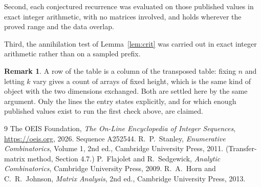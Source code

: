\documentclass[11pt,a4paper]{article}
\theoremstyle{plain}
\theoremstyle{definition}
\newtheorem{remark}[theorem]{Remark}
\begin{document}
Second, each conjectured recurrence was evaluated on those published values in exact
integer arithmetic, with no matrices involved, and holds wherever the proved range and the
data overlap.

Third, the annihilation test of Lemma~\ref{lem:crit} was carried out in exact integer
arithmetic rather than on a sampled prefix.

\begin{remark}
A row of the table is a column of the transposed table: fixing $n$ and letting $k$ vary gives a
count of arrays of fixed height, which is the same kind of object with the two dimensions
exchanged. Both are settled here by the same argument. Only the lines the entry states
explicitly, and for which enough published values exist to run the first check above, are
claimed.
\end{remark}

\begin{thebibliography}{9}
 The OEIS Foundation, \emph{The On-Line Encyclopedia of Integer
Sequences}, \url{https://oeis.org}, 2026. Sequence A252544.
 R.~P.~Stanley, \emph{Enumerative Combinatorics}, Volume 1, 2nd ed.,
Cambridge University Press, 2011. (Transfer-matrix method, Section 4.7.)
 P.~Flajolet and R.~Sedgewick, \emph{Analytic Combinatorics}, Cambridge
University Press, 2009.
 R.~A.~Horn and C.~R.~Johnson, \emph{Matrix Analysis}, 2nd ed., Cambridge
University Press, 2013.
\end{thebibliography}
\end{document}

